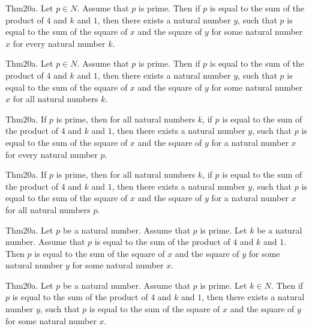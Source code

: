 \documentclass{article}
\begin{document}
Thm20a. Let $p \in N$. Assume that $p$ is prime. Then if $p$ is equal to the sum of the product of $4$ and $k$ and $1$, then there exists a natural number $y$, such that $p$ is equal to the sum of the square of $x$ and the square of $y$ for some natural number $x$ for every natural number $k$.

Thm20a. Let $p \in N$. Assume that $p$ is prime. Then if $p$ is equal to the sum of the product of $4$ and $k$ and $1$, then there exists a natural number $y$, such that $p$ is equal to the sum of the square of $x$ and the square of $y$ for some natural number $x$ for all natural numbers $k$.

Thm20a. If $p$ is prime, then for all natural numbers $k$, if $p$ is equal to the sum of the product of $4$ and $k$ and $1$, then there exists a natural number $y$, such that $p$ is equal to the sum of the square of $x$ and the square of $y$ for a natural number $x$ for every natural number $p$.

Thm20a. If $p$ is prime, then for all natural numbers $k$, if $p$ is equal to the sum of the product of $4$ and $k$ and $1$, then there exists a natural number $y$, such that $p$ is equal to the sum of the square of $x$ and the square of $y$ for a natural number $x$ for all natural numbers $p$.

Thm20a. Let $p$ be a natural number. Assume that $p$ is prime. Let $k$ be a natural number. Assume that $p$ is equal to the sum of the product of $4$ and $k$ and $1$. Then $p$ is equal to the sum of the square of $x$ and the square of $y$ for some natural number $y$ for some natural number $x$.

Thm20a. Let $p$ be a natural number. Assume that $p$ is prime. Let $k \in N$. Then if $p$ is equal to the sum of the product of $4$ and $k$ and $1$, then there exists a natural number $y$, such that $p$ is equal to the sum of the square of $x$ and the square of $y$ for some natural number $x$.
\end{document}
